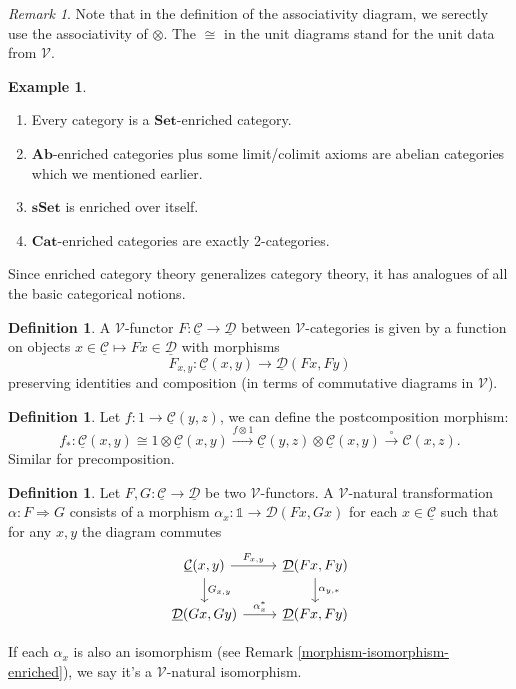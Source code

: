 \documentclass[11pt]{article}
\theoremstyle{definition}
\newtheorem{definition}[theorem]{Definition}
\newtheorem{example}[theorem]{Example}
\theoremstyle{remark}
\newtheorem{remark}[theorem]{Remark}
\newcommand{\calC}{\mathcal{C}}
\newcommand{\ucalC}{\underline{\mathcal{C}}}
\newcommand{\calD}{\mathcal{D}}
\newcommand{\ucalD}{\underline{\mathcal{D}}}
\newcommand{\calV}{\mathcal{V}}
\newcommand{\bbone}{\mathbb{1}}
\begin{document}
\begin{remark}
    Note that in the definition of the associativity diagram, we serectly use the associativity of $\otimes$.
    The $\cong$ in the unit diagrams stand for the unit data from $\calV$.
\end{remark}

\begin{example}
    \begin{enumerate}
        \item Every category is a $\mathbf{Set}$-enriched category.
        \item $\mathbf{Ab}$-enriched categories plus some limit/colimit axioms are abelian categories which we mentioned earlier.
        \item $\mathbf{sSet}$ is enriched over itself.
        \item $\mathbf{Cat}$-enriched categories are exactly 2-categories.
    \end{enumerate}
\end{example}

Since enriched category theory generalizes category theory, it has analogues of all the basic categorical notions.

\begin{definition}
    A $\calV$-functor $F : \ucalC \to \ucalD$ between $\calV$-categories is given by
    a function on objects $x \in \ucalC \mapsto F x \in \ucalD$ with morphisms
    $$F_{x,y} : \ucalC(x,y) \to \ucalD(Fx, Fy)$$
    preserving identities and composition (in terms of commutative diagrams in $\calV$).
\end{definition}

\begin{definition}
    Let $f : 1 \to \ucalC(y,z)$, we can define the postcomposition morphism:
    $$f_* : \ucalC(x,y) \cong 1 \otimes \ucalC(x,y) \stackrel{f\otimes 1}{\to}
        \ucalC(y,z)\otimes \ucalC(x,y)\stackrel{\circ}{\to} \calC(x,z).$$
    Similar for precomposition.
\end{definition}

\begin{definition}
    Let $F, G : \ucalC \to \ucalD$ be two $\calV$-functors.
    A $\calV$-natural transformation $\alpha : F \Rightarrow G$ consists of a morphism
    $\alpha_x : \bbone \to \calD(Fx, Gx)$ for each $x \in \ucalC$ such that for any $x,y$ the diagram commutes
    \[
    \begin{tikzcd}
        \ucalC(x,y) \arrow[r, "F_{x,y}"] \arrow[d, "G_{x,y}"] & \ucalD(Fx,Fy) \arrow[d, "\alpha_{y,*}"] \\
        \ucalD(Gx,Gy) \arrow[r, "\alpha_{x}^*"] & \ucalD(Fx,Fy)
    \end{tikzcd}
    \] 

    If each $\alpha_x$ is also an isomorphism (see Remark \ref{morphism-isomorphism-enriched}),
    we say it's a $\calV$-natural isomorphism.
\end{definition}
\end{document}
